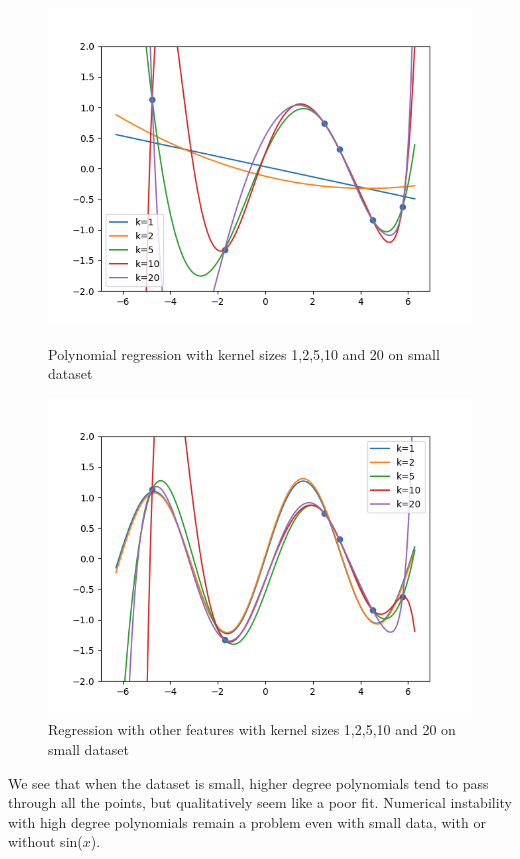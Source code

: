 \begin{answer}
\begin{figure}[H]
  \centering
  \vspace{2mm}
  \includegraphics[width=0.65\linewidth]{../src/featuremaps/small-poly.png}
  \caption{Polynomial regression with kernel sizes 1,2,5,10 and 20
  on small dataset}
  \centering
  \vspace{2mm}
  \includegraphics[width=0.65\linewidth]{../src/featuremaps/small-sine.png}
  \centering
\caption{Regression with other features with kernel sizes 1,2,5,10 and 20
on small dataset}

\end{figure}

We see that when the dataset is small, higher degree polynomials tend to pass through all the points, but qualitatively seem like a poor fit. Numerical instability with high degree polynomials remain a problem even with small data, with or without sin($x$).
\end{answer}
